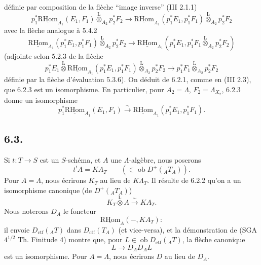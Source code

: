 \documentclass[11pt]{article}
\newcommand{\R}{\mathrm{R}}\newcommand{\RHomCore}{\mathrm{RHom}}
\providecommand{\RHom}{\RHomCore}
\providecommand{\uRHom}{\underline{\RHom}}
\providecommand{\lten}{\overset{\mathrm L}{\otimes}}
\providecommand{\Ob}{\operatorname{ob}}
\providecommand{\RHom}{\RHomCore}
\providecommand{\lten}{\overset{\mathrm L}{\otimes}}
\providecommand{\RHom}{\R\mathcal{H}om}
\providecommand{\lten}{\overset{\mathrm L}{\otimes}}
\providecommand{\Ob}{\operatorname{ob}}
\providecommand{\R}{\mathrm R}
\providecommand{\lten}{\overset{\mathrm L}{\otimes}}
\providecommand{\lten}{\overset{\mathrm L}{\otimes}}
\providecommand{\Ob}{\operatorname{Ob}}
\providecommand{\lten}{\overset{\mathrm L}{\otimes}}
\providecommand{\RHom}{\RHomCore}
\providecommand{\Ob}{\operatorname{ob}}
\providecommand{\Ob}{\operatorname{Ob}}
\providecommand{\lten}{\overset{\mathrm L}{\otimes}}
\begin{document}
définie par composition de la flèche ``image inverse'' (III 2.1.1)
\[
p_1^*\uRHom_{A_1}(E_1,F_1)\lten_{A_2}p_2^*F_2
\longrightarrow
\uRHom_{A_1}(p_1^*E_1,p_1^*F_1)\lten_{A_2}p_2^*F_2
\]
avec la flèche analogue à 5.4.2
\[
\uRHom_{A_1}(p_1^*E_1,p_1^*F_1)\lten_{A_2}p_2^*F_2
\longrightarrow
\uRHom_{A_1}(p_1^*E_1,p_1^*F_1\lten_{A_2}p_2^*F_2)
\]
(adjointe selon 5.2.3 de la flèche
\[
p_1^*E_1\lten\uRHom_{A_1}(p_1^*E_1,p_1^*F_1)\lten_{A_2}p_2^*F_2
\longrightarrow
p_1^*F_1\lten_{A_2}p_2^*F_2
\]
définie par la flèche d'évaluation 5.3.6). On déduit de 6.2.1, comme en (III 2.3), 
que 6.2.3 est un
isomorphisme. En particulier, pour $A_2=\Lambda$, $F_2=\Lambda_{X_2}$, 6.2.3 donne un isomorphisme
\begin{equation}
p_1^*\uRHom_{A_1}(E_1,F_1)
\xrightarrow{\sim}
\uRHom_{A_1}(p_1^*E_1,p_1^*F_1).
\tag{6.2.4}
\end{equation}

\subsection*{6.3.}
Si $t:T\to S$ est un $S$-schéma, et $A$ une $\Lambda$-algèbre, nous poserons
\begin{equation}
t^!A = KA_T \qquad(\in\Ob D^+({}_AT_A)).
\tag{6.3.1}
\end{equation}
Pour $A=\Lambda$, nous écrirons $K_T$ au lieu de $K\Lambda_T$. Il résulte de 6.2.2 qu'on a un isomorphisme canonique (de $D^+({}_AT_A)$)
\begin{equation}
K_T\lten A\xrightarrow{\sim}KA_T.
\tag{6.3.2}
\end{equation}
Nous noterons $D_A$ le foncteur
\[
\uRHom_A(-,KA_T) :
\]
il envoie $D_{\mathrm{ctf}}({}_AT)$ dans $D_{\mathrm{ctf}}(T_A)$ (et vice-versa), et la démonstration de (SGA $4^{1/2}$ Th. Finitude 4) montre que, pour $L\in\Ob D_{\mathrm{ctf}}({}_AT)$, la flèche canonique
\[
L\longrightarrow D_AD_AL
\]
est un isomorphisme. Pour $A=\Lambda$, nous écrirons $D$ au lieu de $D_A$.
\end{document}
